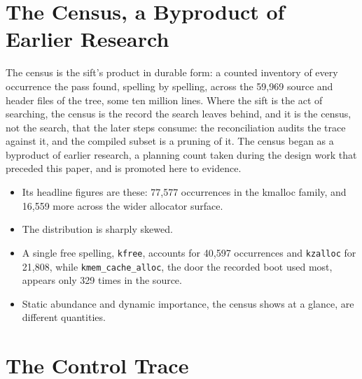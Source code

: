 \documentclass[11pt]{article}
\begin{document}
\section{The Census, a Byproduct of Earlier Research}

The census is the sift's product in durable form: a counted
inventory of every occurrence the pass found, spelling by spelling,
across the 59,969 source and header files of the tree, some ten
million lines. Where the sift is the act of searching, the census
is the record the search leaves behind, and it is the census, not
the search, that the later steps consume: the reconciliation audits
the trace against it, and the compiled subset is a pruning of it.
The census began as a byproduct of earlier research, a planning
count taken during the design work that preceded this paper, and is
promoted here to evidence.
\begin{itemize}
\item Its headline figures are these: 77,577 occurrences in the kmalloc family, and 16,559 more across the wider allocator surface.
\item The distribution is sharply skewed.
\item A single free spelling, \texttt{kfree}, accounts for 40,597 occurrences and \texttt{kzalloc} for 21,808, while \texttt{kmem\_cache\_alloc}, the door the recorded boot used most, appears only 329 times in the source.
\item Static abundance and dynamic importance, the census shows at a glance, are different quantities.
\end{itemize}

\section{The Control Trace}
\end{document}
